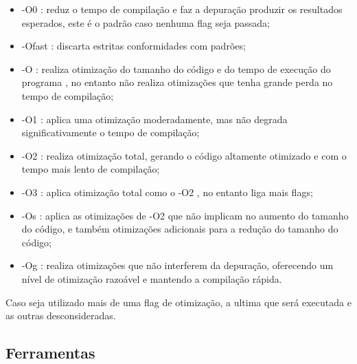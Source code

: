 \begin{itemize}
	\item -O0 : reduz o tempo de compilação e faz a depuração produzir os
 resultados esperados, este é o padrão caso nenhuma flag seja passada;
    \item -Ofast : discarta estritas conformidades com padrões;
    \item -O  : realiza otimização do tamanho do código e do tempo de execução do programa ,
 no entanto não realiza otimizações que tenha grande perda no tempo de compilação;
    \item -O1 :  aplica uma otimização moderadamente, mas não degrada significativamente
 o tempo de compilação;
    \item -O2 : realiza otimização total, gerando o código altamente otimizado e com o
 tempo mais lento de compilação;
    \item -O3 : aplica otimização total como o -O2 , no entanto liga mais flags;
    \item -Os : aplica as otimizações de -O2 que não implicam no aumento do tamanho do código,
 e também otimizações adicionais para a redução do tamanho do código;
    \item -Og : realiza otimizações  que não interferem da depuração,
 oferecendo um nível de otimização razoável e  mantendo a compilação rápida.
\end{itemize}

Caso seja utilizado mais de uma flag de otimização, a ultima que será executada
 e as outras desconsideradas.


\subsection{Ferramentas}  \label{ferramentas_de_otimizacao}


